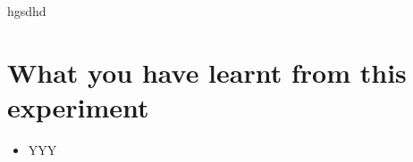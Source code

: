 \documentclass{article}
\begin{document}
hgsdhd


\section{What you have learnt from this experiment}
\begin{itemize}
    \item YYY 
 
\end{itemize}







\end{document}
